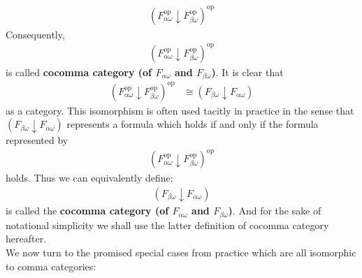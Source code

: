 \begin{align*}
  \left(
    F_{\alpha\omega}^{\mathrm{op}}
    \downarrow
    F_{\beta\omega}^{\mathrm{op}}
  \right)^{\mathrm{op}}
\end{align*}
Consequently,
\begin{align*}
  \left(
    F_{\alpha\omega}^{\mathrm{op}}
    \downarrow
    F_{\beta\omega}^{\mathrm{op}}
  \right)^{\mathrm{op}}
\end{align*}
is called \textbf{cocomma category (of $F_{\alpha\omega}$ and $F_{\beta\omega}$)}. It is clear that
\begin{align*}
  \left(
    F_{\alpha\omega}^{\mathrm{op}}
    \downarrow
    F_{\beta\omega}^{\mathrm{op}}
  \right)^{\mathrm{op}}
  &\cong
  (F_{\beta\omega} \downarrow F_{\alpha\omega})
\end{align*}
as a category. This isomorphism is often used tacitly in practice in the sense that $(F_{\beta\omega} \downarrow F_{\alpha\omega})$ represents a formula which holds if and only if the formula represented by
\begin{align*}
  \left(
    F_{\alpha\omega}^{\mathrm{op}}
    \downarrow
    F_{\beta\omega}^{\mathrm{op}}
  \right)^{\mathrm{op}}
\end{align*}
holds. Thus we can equivalently define:
\begin{align*}
  (F_{\beta\omega} \downarrow F_{\alpha\omega})
\end{align*}
is called the \textbf{cocomma category (of $F_{\alpha\omega}$ and $F_{\beta\omega}$)}. And for the sake of notational simplicity we shall use the latter definition of cocomma category hereafter.
\\
We now turn to the promised special cases from practice which are all isomorphic to comma categories:
